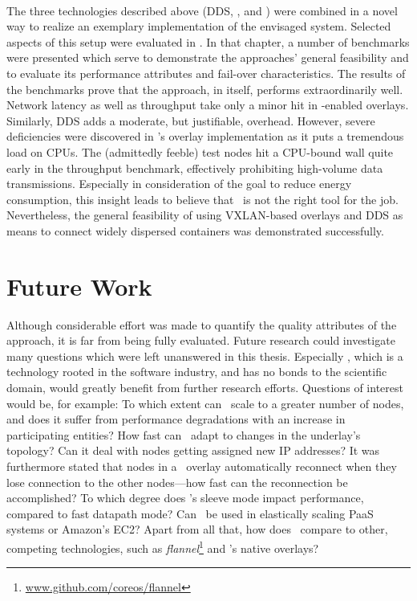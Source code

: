 \paragraph{}
The three technologies described above (DDS, \docker , and \wnet ) were combined in a novel way to realize an exemplary implementation of the envisaged system. Selected aspects of this setup were evaluated in . In that chapter, a number of benchmarks were presented which serve to demonstrate the approaches' general feasibility and to evaluate its performance attributes and fail-over characteristics. The results of the benchmarks prove that the approach, in itself, performs extraordinarily well. Network latency as well as throughput take only a minor hit in \weave -enabled overlays. Similarly, DDS adds a moderate, but justifiable, overhead. However, severe deficiencies were discovered in \weave 's overlay implementation as it puts a tremendous load on CPUs. The (admittedly feeble) test nodes hit a CPU-bound wall quite early in the throughput benchmark, effectively prohibiting high-volume data transmissions. Especially in consideration of the goal to reduce energy consumption, this insight leads to believe that \wnet\ is not the right tool for the job. Nevertheless, the general feasibility of using VXLAN-based overlays and DDS as means to connect widely dispersed containers was demonstrated successfully.

\section{Future Work}
Although considerable effort was made to quantify the quality attributes of the approach, it is far from being fully evaluated. Future research could investigate many questions which were left unanswered in this thesis. Especially \wnet , which is a technology rooted in the software industry, and has no bonds to the scientific domain, would greatly benefit from further research efforts. Questions of interest would be, for example: To which extent can \wnet\ scale to a greater number of nodes, and does it suffer from performance degradations with an increase in participating entities? How fast can \wnet\ adapt to changes in the underlay's topology? Can it deal with nodes getting assigned new IP addresses? It was furthermore stated that nodes in a \wnet\ overlay automatically reconnect when they lose connection to the other nodes---how fast can the reconnection be accomplished? To which degree does \weave 's sleeve mode impact performance, compared to fast datapath mode? Can \weave\ be used in elastically scaling PaaS systems or Amazon's EC2? Apart from all that, how does \weave\ compare to other, competing technologies, such as \emph{flannel}\footnote{\url{www.github.com/coreos/flannel}} and \docker 's native overlays?

